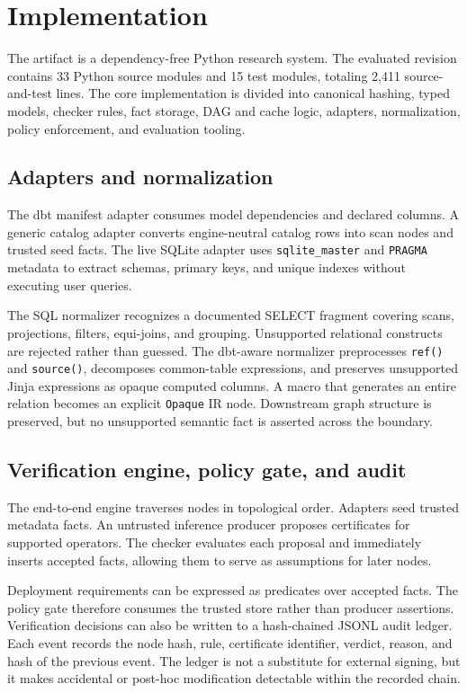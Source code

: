 \section{Implementation}

The artifact is a dependency-free Python research system. The evaluated revision contains 33 Python source modules and 15 test modules, totaling 2,411 source-and-test lines. The core implementation is divided into canonical hashing, typed models, checker rules, fact storage, DAG and cache logic, adapters, normalization, policy enforcement, and evaluation tooling.

\subsection{Adapters and normalization}

The dbt manifest adapter consumes model dependencies and declared columns. A generic catalog adapter converts engine-neutral catalog rows into scan nodes and trusted seed facts. The live SQLite adapter uses \texttt{sqlite\_master} and \texttt{PRAGMA} metadata to extract schemas, primary keys, and unique indexes without executing user queries.

The SQL normalizer recognizes a documented SELECT fragment covering scans, projections, filters, equi-joins, and grouping. Unsupported relational constructs are rejected rather than guessed. The dbt-aware normalizer preprocesses \texttt{ref()} and \texttt{source()}, decomposes common-table expressions, and preserves unsupported Jinja expressions as opaque computed columns. A macro that generates an entire relation becomes an explicit \texttt{Opaque} IR node. Downstream graph structure is preserved, but no unsupported semantic fact is asserted across the boundary.

\subsection{Verification engine, policy gate, and audit}

The end-to-end engine traverses nodes in topological order. Adapters seed trusted metadata facts. An untrusted inference producer proposes certificates for supported operators. The checker evaluates each proposal and immediately inserts accepted facts, allowing them to serve as assumptions for later nodes.

Deployment requirements can be expressed as predicates over accepted facts. The policy gate therefore consumes the trusted store rather than producer assertions. Verification decisions can also be written to a hash-chained JSONL audit ledger. Each event records the node hash, rule, certificate identifier, verdict, reason, and hash of the previous event. The ledger is not a substitute for external signing, but it makes accidental or post-hoc modification detectable within the recorded chain.

